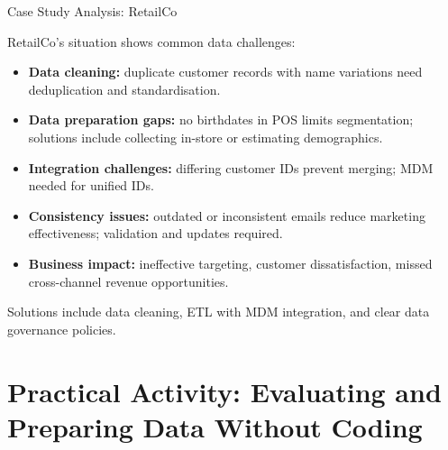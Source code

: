 \documentclass[aspectratio=169, table]{beamer}
\begin{document}
\begin{frame}{Case Study Analysis: RetailCo}
	\vspace{20pt}
	
	RetailCo’s situation shows common data challenges:
	
	\begin{itemize}
		\item \textbf{Data cleaning:} duplicate customer records with name variations need deduplication and standardisation.
		
		\item \textbf{Data preparation gaps:} no birthdates in POS limits segmentation; solutions include collecting in-store or estimating demographics.
		
		\item \textbf{Integration challenges:} differing customer IDs prevent merging; MDM needed for unified IDs.
		
		\item \textbf{Consistency issues:} outdated or inconsistent emails reduce marketing effectiveness; validation and updates required.
		
		\item \textbf{Business impact:} ineffective targeting, customer dissatisfaction, missed cross-channel revenue opportunities.
	\end{itemize}
	
	Solutions include data cleaning, ETL with MDM integration, and clear data governance policies.
	
\end{frame}


\section{Practical Activity: Evaluating and Preparing Data Without Coding}
\end{document}

